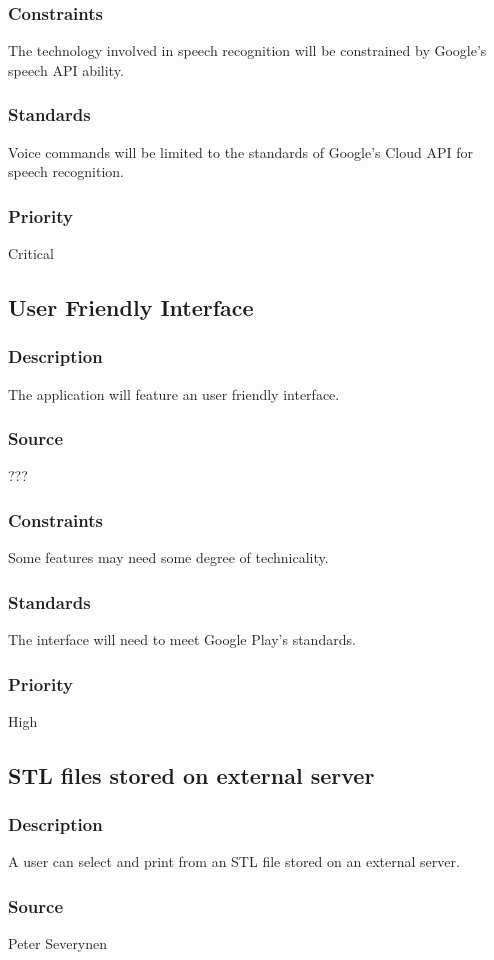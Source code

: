\subsubsection{Constraints}
The technology involved in speech recognition will be constrained by Google's speech API ability. 
\subsubsection{Standards}
Voice commands will be limited to the standards of Google's Cloud API for speech recognition. 
\subsubsection{Priority}
Critical
\subsection{User Friendly Interface}
\subsubsection{Description}
The application will feature an user friendly interface.
\subsubsection{Source}
???
\subsubsection{Constraints}
Some features may need some degree of technicality. 
\subsubsection{Standards}
The interface will need to meet Google Play's standards.
\subsubsection{Priority}
High
\subsection{STL files stored on external server}
\subsubsection{Description}
A user can select and print from an STL file stored on an external server.
\subsubsection{Source}
Peter Severynen
